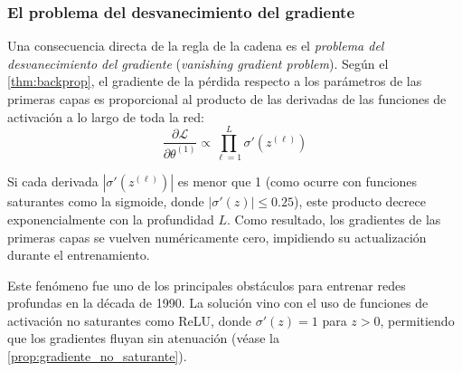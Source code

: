 \subsubsection{El problema del desvanecimiento del gradiente}\label{subsubsec:vanishing_gradient}

Una consecuencia directa de la regla de la cadena es el \textit{problema del desvanecimiento del gradiente} (\textit{vanishing gradient problem}). Según el \autoref{thm:backprop}, el gradiente de la pérdida respecto a los parámetros de las primeras capas es proporcional al producto de las derivadas de las funciones de activación a lo largo de toda la red:
\[
\frac{\partial \mathcal{L}}{\partial \theta^{(1)}} \propto \prod_{\ell=1}^{L} \sigma'(z^{(\ell)})
\]

Si cada derivada $|\sigma'(z^{(\ell)})|$ es menor que 1 (como ocurre con funciones saturantes como la sigmoide, donde $|\sigma'(z)| \leq 0.25$), este producto decrece exponencialmente con la profundidad $L$. Como resultado, los gradientes de las primeras capas se vuelven numéricamente cero, impidiendo su actualización durante el entrenamiento.

Este fenómeno fue uno de los principales obstáculos para entrenar redes profundas en la década de 1990. La solución vino con el uso de funciones de activación no saturantes como \gls{ReLU}, donde $\sigma'(z) = 1$ para $z > 0$, permitiendo que los gradientes fluyan sin atenuación (véase la \autoref{prop:gradiente_no_saturante}).

